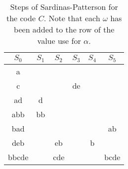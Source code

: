 \documentclass{subfiles}
\begin{document}
    \begin{table}[!hb]
        \centering
        \begin{tabular}{|c|c|c|c|c|c|}
            \hline 
            \(S_{0}\) & \(S_{1}\)               & \(S_{2}\)               & \(S_{3}\)               & \(S_{4}\)             & \(S_{5}\)                 \\ 
            \hline
            a       &                           &                         &                         &                       &                           \\
            c       &                           &                         & \textcolor{rpRose}{de}  &                       &                           \\ 
            ad      & \textcolor{rpLove}{d}     &                         &                         &                       &                           \\ 
            abb     & \textcolor{rpLove}{bb}    &                         &                         &                       &                           \\ 
            bad     &                           &                         &                         &                       & \textcolor{rpFoam}{ab}    \\ 
            deb     &                           & \textcolor{rpGold}{eb}  &                         & \textcolor{rpPine}{b} &                           \\ 
            bbcde   &                           & \textcolor{rpGold}{cde} &                         &                       & \textcolor{rpFoam}{bcde}  \\
            \hline
        \end{tabular}
        \caption{Steps of Sardinas-Patterson for the code \(C\). 
        Note that each \(\omega\) has been added to the row of the value use for \(\alpha\).}
        \label{Tab:1}
    \end{table}    
\end{document}
